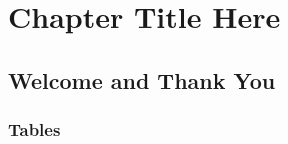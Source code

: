 
\chapter{Chapter Title Here} %

\label{Chapter1} %


\newcommand{\keyword}[1]{\textbf{#1}}
\newcommand{\tabhead}[1]{\textbf{#1}}
\newcommand{\code}[1]{\texttt{#1}}
\newcommand{\file}[1]{\texttt{\bfseries#1}}
\newcommand{\option}[1]{\texttt{\itshape#1}}


\section{Welcome and Thank You}

\subsection{Tables}

